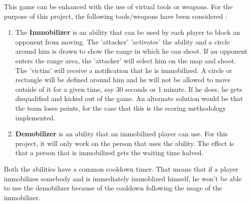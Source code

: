 \documentclass{article}
\begin{document}
This game can be enhanced with the use of virtual tools or weapons. For the
purpose of this project, the following tools/weapons have been considered :
\begin{enumerate}
	
	\item The \textbf{Immobilizer} is an ability that can be used by each player to
	block an opponent from moving. The 'attacker' 'activates' the ability and a
	circle around him is drawn to show the range in which he can shoot. If an
	opponent enters the range area, the 'attacker' will select him on the map and
	shoot. The 'victim' will receive a notification that he is immobilized. A
	circle or rectangle will be defined around him and he will not be allowed to
	move outside of it for a given time, say 30 seconds or 1 minute. If he does, he
	gets disqualified and kicked out of the game. An alternate solution would be
	that the team loses points, for the case that this is the scoring methodology
	implemented.
	 
	\item \textbf{Demobilizer} is an ability that an immobilized player can use.
	For this project, it will only work on the person that uses the ability. The
	effect is that a person that is immobilized gets the waiting time halved.
	
\end{enumerate}
Both the abilities have a common cooldown timer. That means that if a player
immobilizes somebody and is immediately immoblized himself, he won't be able to
use the demobilizer because of the cooldown following the usage of the
immobilizer.
\end{document}
